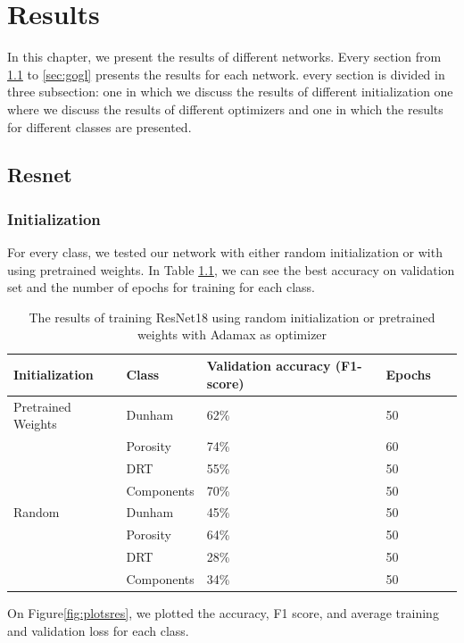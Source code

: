 \chapter{Results}\label{chp:results}

In this chapter, we present the results of different networks. Every section from \ref{sec:res} to \ref{sec:gogl} presents the results for each network. every section is divided in three subsection: one in which we discuss the results of different initialization one where we discuss the results of different optimizers and one in which the results for different classes are presented. 
\section{Resnet}\label{sec:res}
\subsection{Initialization}
For every class, we tested our network with either random initialization or with using pretrained weights. In Table \ref{tab:resinit}, we can see the best accuracy on validation set and the number of epochs for training for each class.  

\begin{table}
\caption{\label{tab:resinit} The results of training ResNet18 using random initialization or pretrained weights with Adamax as optimizer}
\centering
\begin{tabular}[b]{| l | l | l | l | l |}
\hline
    Initialization & Class & Validation accuracy (F1-score) & Epochs\ \\ \hline
    \multirow{}{}{Pretrained Weights} & Dunham &  62\%  & 50 \\ 
    & Porosity & 74\%  &  60 \\
    &DRT & 55\% &  50 \\
    &Components & 70\% &  50 \\ \hline
     \multirow{}{}{Random} & Dunham &  45\%  & 50 \\
    & Porosity & 64\% &  50 \\
    &DRT & 28\% & 50 \\
    &Components & 34\% &  50 \\ \hline
    
\end{tabular} 
\end{table}
On Figure\ref{fig:plotsres}, we plotted the accuracy, F1 score, and average training and validation loss for each class. 



